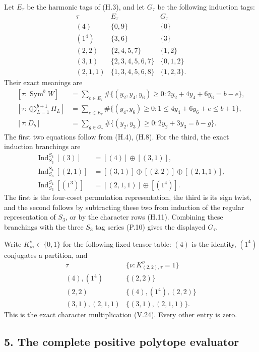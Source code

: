 \documentclass[
  10pt,
]{article}
\begin{document}
Let \(E_\tau\) be the harmonic tags of (H.3), and let \(G_\tau\) be the
following induction tags: \[
\begin{array}{c|c|c}
\tau&E_\tau&G_\tau\\ \hline
(4)&\{0,9\}&\{0\}\\
(1^4)&\{3,6\}&\{3\}\\
(2,2)&\{2,4,5,7\}&\{1,2\}\\
(3,1)&\{2,3,4,5,6,7\}&\{0,1,2\}\\
(2,1,1)&\{1,3,4,5,6,8\}&\{1,2,3\}.
\end{array}
\tag{A.21}
\] Their exact meanings are \[
\begin{aligned}
[\tau:\operatorname{Sym}^bW]
&=\sum_{e\in E_\tau}
\#\{(y_2,y_4,y_6)\ge0:2y_2+4y_4+6y_6=b-e\},\\
[\tau:\bigoplus_{L=1}^{b+1}H_L]
&=\sum_{e\in E_\tau}
\#\{(y_4,y_6)\ge0:1\le4y_4+6y_6+e\le b+1\},\\
[\tau:D_b]
&=\sum_{g\in G_\tau}
\#\{(y_2,y_3)\ge0:2y_2+3y_3=b-g\}.
\end{aligned}
\tag{A.22}
\] The first two equations follow from (H.4), (H.8). For the third, the
exact induction branchings are \[
\begin{aligned}
\operatorname{Ind}_{S_3}^{S_4}[(3)]&=[(4)]\oplus[(3,1)],\\
\operatorname{Ind}_{S_3}^{S_4}[(2,1)]&=[(3,1)]\oplus[(2,2)]\oplus[(2,1,1)],\\
\operatorname{Ind}_{S_3}^{S_4}[(1^3)]&=[(2,1,1)]\oplus[(1^4)].
\end{aligned}
\tag{A.23}
\] The first is the four-coset permutation representation, the third is
its sign twist, and the second follows by subtracting these two from
induction of the regular representation of \(S_3\), or by the character
rows (H.11). Combining these branchings with the three \(S_3\) tag
series (P.10) gives the displayed \(G_\tau\).

Write \(K_{\rho\tau}^{\nu}\in\{0,1\}\) for the following fixed tensor
table: \((4)\) is the identity, \((1^4)\) conjugates a partition, and \[
\begin{array}{c|c}
\tau&\{\nu:K_{(2,2),\tau}^{\nu}=1\}\\ \hline
(4),(1^4)&\{(2,2)\}\\
(2,2)&\{(4),(1^4),(2,2)\}\\
(3,1),(2,1,1)&\{(3,1),(2,1,1)\}.
\end{array}
\tag{A.24}
\] This is the exact character multiplication (V.24). Every other entry
is zero.

\subsection{5. The complete positive polytope
evaluator}\label{the-complete-positive-polytope-evaluator}
\end{document}
